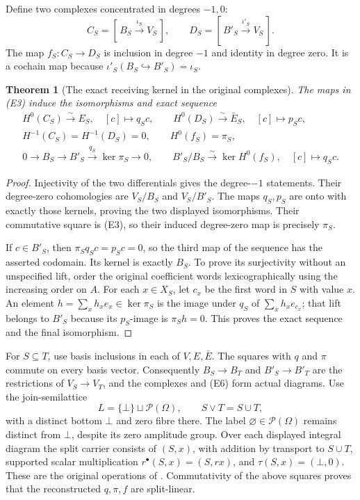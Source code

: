 \documentclass[11pt,a4paper]{article}
\newtheorem{theorem}{Theorem}[section]
\begin{document}
Define two complexes concentrated in degrees \(-1,0\):
\[
 C_S=[\,B_S\overset{\iota_S}{\longrightarrow}V_S\,],\qquad
 D_S=[\,B'_S\overset{\iota'_S}{\longrightarrow}V_S\,].
 \tag{E5}
\]
The map \(f_S:C_S\to D_S\) is inclusion in degree \(-1\) and identity
in degree zero.  It is a cochain map because
\(\iota'_S(B_S\hookrightarrow B'_S)=\iota_S\).

\begin{theorem}[The exact receiving kernel in the original complexes]
The maps in (E3) induce the isomorphisms and exact sequence
\[
 \begin{gathered}
 H^0(C_S)\overset{\sim}{\longrightarrow}E_S,\quad[c]\longmapsto q_Sc,
 \qquad
 H^0(D_S)\overset{\sim}{\longrightarrow}\bar E_S,\quad[c]\longmapsto p_Sc,\\
 H^{-1}(C_S)=H^{-1}(D_S)=0,\qquad H^0(f_S)=\pi_S,\\
 0\longrightarrow B_S\longrightarrow B'_S
       \overset{q_S}{\longrightarrow}\ker\pi_S\longrightarrow0,\qquad
 B'_S/B_S\overset{\sim}{\longrightarrow}\ker H^0(f_S),
       \quad[c]\longmapsto q_Sc .
 \end{gathered}
 \tag{E6}
\]
\end{theorem}
\begin{proof}
Injectivity of the two differentials gives the degree-\(-1\) statements.
Their degree-zero cohomologies are \(V_S/B_S\) and \(V_S/B'_S\).
The maps \(q_S,p_S\) are onto with exactly those kernels, proving the two
displayed isomorphisms.  Their commutative square is (E3), so their induced
degree-zero map is precisely \(\pi_S\).

If \(c\in B'_S\), then \(\pi_Sq_Sc=p_Sc=0\), so the third map of the
sequence has the asserted codomain.  Its kernel is exactly \(B_S\).
To prove its surjectivity without an unspecified lift, order the original
coefficient words lexicographically using the increasing order on \(A\).
For each \(x\in X_S\), let \(c_x\) be the first word in \(S\) with value
\(x\).  An element \(h=\sum_xh_xe_x\in\ker\pi_S\) is the image under
\(q_S\) of \(\sum_xh_xe_{c_x}\); that lift belongs to \(B'_S\) because
its \(p_S\)-image is \(\pi_Sh=0\).  This proves the exact sequence and
the final isomorphism.
\end{proof}

For \(S\subseteq T\), use basis inclusions in each of \(V,E,\bar E\).
The squares with \(q\) and \(\pi\) commute on every basis vector.
Consequently \(B_S\to B_T\) and \(B'_S\to B'_T\) are the restrictions
of \(V_S\to V_T\), and the complexes and (E6) form actual diagrams.
Use the join-semilattice
\[
 L=\{\bot\}\sqcup\mathcal P(\Omega),\qquad S\vee T=S\cup T,
 \tag{E7}
\]
with a distinct bottom \(\bot\) and zero fibre there.  The label
\(\varnothing\in\mathcal P(\Omega)\) remains distinct from \(\bot\),
despite its zero amplitude group.  Over each displayed integral diagram
the split carrier consists of \((S,x)\), with addition by transport to
\(S\cup T\), supported scalar multiplication \(r^\bullet(S,x)=(S,rx)\),
and \(\tau(S,x)=(\bot,0)\).  These are the original operations
of \cite[(D2)]{ep:support}.  Commutativity of the above squares proves
that the reconstructed \(q,\pi,f\) are split-linear.
\end{document}
